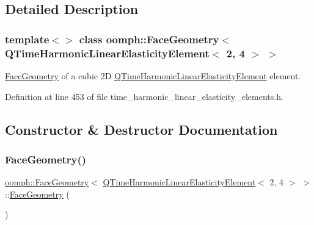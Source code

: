 \subsection{Detailed Description}
\subsubsection*{template$<$$>$\newline
class oomph\+::\+Face\+Geometry$<$ Q\+Time\+Harmonic\+Linear\+Elasticity\+Element$<$ 2, 4 $>$ $>$}

\hyperlink{classoomph_1_1FaceGeometry}{Face\+Geometry} of a cubic 2D \hyperlink{classoomph_1_1QTimeHarmonicLinearElasticityElement}{Q\+Time\+Harmonic\+Linear\+Elasticity\+Element} element. 

Definition at line 453 of file time\+\_\+harmonic\+\_\+linear\+\_\+elasticity\+\_\+elements.\+h.



\subsection{Constructor \& Destructor Documentation}
\mbox{\label{classoomph_1_1FaceGeometry_3_01QTimeHarmonicLinearElasticityElement_3_012_00_014_01_4_01_4_a2a7329c39181450f066d112416db9a04}} 
\subsubsection{\texorpdfstring{Face\+Geometry()}{FaceGeometry()}}
{\footnotesize\ttfamily \hyperlink{classoomph_1_1FaceGeometry}{oomph\+::\+Face\+Geometry}$<$ \hyperlink{classoomph_1_1QTimeHarmonicLinearElasticityElement}{Q\+Time\+Harmonic\+Linear\+Elasticity\+Element}$<$ 2, 4 $>$ $>$\+::\hyperlink{classoomph_1_1FaceGeometry}{Face\+Geometry} (\begin{DoxyParamCaption}{ }\end{DoxyParamCaption})\hspace{0.3cm}{\ttfamily [inline]}}



